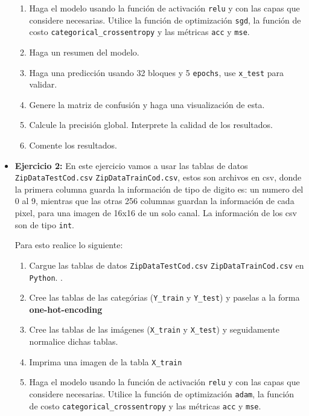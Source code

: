 \documentclass[spanish,12pt]{report}
\begin{document}
\begin{itemize}
\begin{enumerate}
\item Haga el modelo usando la función de activación {\tt relu} y con las capas que considere necesarias. Utilice la función de optimización {\tt sgd}, la función de costo {\tt categorical\_crossentropy} y las métricas {\tt acc} y {\tt mse}.

\item Haga un resumen del modelo.

\item Haga una predicción usando 32 bloques y 5 {\tt epochs}, use {\tt x\_test} para validar.

\item Genere la matriz de confusión  y haga una visualización de esta.

\item Calcule la precisión global. Interprete
la calidad de los resultados.

\item Comente los resultados.

\end{enumerate}



\item {\bf{\color{Red} Ejercicio 2:}} {\sf [40 puntos]} En este ejercicio vamos a usar las tablas de datos {\tt ZipDataTestCod.csv} {\tt ZipDataTrainCod.csv}, estos son archivos en csv, donde la primera columna guarda la información de tipo de digito es: un numero del 0 al 9, mientras que las otras 256 columnas guardan la información de cada pixel, para una imagen de 16x16 de un solo canal. La información de los csv son de tipo {\tt int}.


Para esto realice lo siguiente:

\begin{enumerate}
\item Cargue las tablas de datos  {\tt ZipDataTestCod.csv} {\tt ZipDataTrainCod.csv} en {\tt Python}. {\bf }.

\item Cree las tablas de las categórias ({\tt Y\_train}  y {\tt Y\_test}) y paselas a la forma {\bf one-hot-encoding} 

\item Cree las tablas de las imágenes ({\tt X\_train}  y {\tt X\_test}) y seguidamente normalice dichas tablas.

\item Imprima una imagen de la tabla \texttt{X\_train}

\item Haga el modelo usando la función de activación {\tt relu} y con las capas que considere necesarias. Utilice la función de optimización {\tt adam}, la función de costo {\tt categorical\_crossentropy} y las métricas {\tt acc} y {\tt mse}.


\end{enumerate}
\end{itemize}
\end{document}
